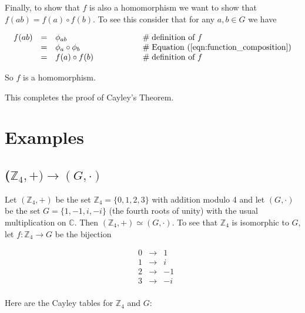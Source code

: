\documentclass{article}
\theoremstyle{definition}
\begin{document}
\bigskip
\noindent
Finally, to show that $f$ is also a homomorphism we want to show
that $f(ab) = f(a) \circ f(b)$. To see this consider that for any
$a,b \in G$ we have  

\bigskip
\begin{equation*}
\begin{array}{rcll}
f(ab)
&=& \phi_{ab}                   &\hspace{5em} \mathrel{\#} \text{definition of $f$} \\
&=& \phi_{a} \circ \phi_{b}     &\hspace{5em}\mathrel{\#} \text{Equation (\ref{eqn:function_composition})} \\
&=& f(a) \circ f(b)             &\hspace{5em}\mathrel{\#} \text{definition of $f$}
\end{array}
\end{equation*}

\bigskip
\noindent
So $f$ is a homomorphism.

\bigskip
\noindent
This completes the proof of Cayley's Theorem.


\section{Examples}


\subsection{($\mathbb{Z}_4,+) \rightarrow (G,\cdot)$}
Let $(\mathbb{Z}_4,+)$ be the set $\mathbb{Z}_4 = \{0,1,2,3\}$
with addition modulo 4 and let $(G,\cdot)$ be the set $G =
\{1,-1,i,-i\}$ (the fourth roots of unity) with the usual
multiplication on $\mathbb{C}$. Then $(\mathbb{Z}_4,+) \simeq
(G,\cdot)$. To see that $\mathbb{Z}_4$ is isomorphic to $G$, let
$f: \mathbb{Z}_4 \rightarrow G$ be the bijection

\begin{equation*}
\begin{array}{lccr}
& 0 &\longrightarrow&   1 \\
& 1 &\longrightarrow&   i \\
& 2 &\longrightarrow&  -1 \\
& 3 &\longrightarrow&  -i \\
\end{array}
\end{equation*}

\bigskip
\noindent
Here are the Cayley tables for $\mathbb{Z}_4$ and $G$: 
\end{document}
